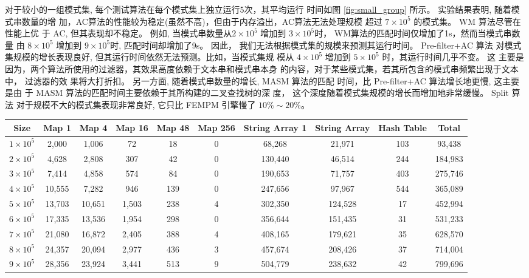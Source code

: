 对于较小的一组模式集, 每个测试算法在每个模式集上独立运行5次，其平均运行
时间如图 \ref{fig:small_group} 所示。 实验结果表明, 随着模式串数量的增
加，AC算法的性能较为稳定(虽然不高)，但由于内存溢出，AC算法无法处理规模
超过 $7 \times 10^5$ 的模式集。 \textsf{WM} 算法尽管在性能上优
于 \textsf{AC}, 但其表现却不稳定。 例如, 当模式串数量从$2 \times 10^5$
增加到 $3 \times 10^5$时， WM算法的匹配时间仅增加了1s，然而当模式串数量
由 $8 \times 10^5$ 增加到 $9 \times 10^5$时, 匹配时间却增加了9s。 因此，
我们无法根据模式集的规模来预测其运行时间。 \textsf{Pre-filter+AC} 算法
对模式集规模的增长表现良好, 但其运行时间依然无法预测。比如，当模式集规
模从 $4 \times 10^5$ 增加到 $5 \times 10^5$ 时，其运行时间几乎不变。 这
主要是因为，两个算法所使用的过滤器，其效果高度依赖于文本串和模式串本身
的内容，对于某些模式集，若其所包含的模式串频繁出现于文本中， 过滤器的效
果将大打折扣。 另一方面, 随着模式串数量的增长, \textsf{MASM} 算法的匹配
时间，比 \textsf{Pre-filter+AC} 算法增长地更慢, 这主要是由
于 \textsf{MASM} 算法的匹配时间主要依赖于其所构建的二叉查找树的深
度， 这个深度随着模式集规模的增长而增加地非常缓慢。 \textsf{Split} 算法
对于规模不大的模式集表现非常良好, 它只比 \textsf{FEMPM} 引擎慢了 $10\%
\sim 20\%$。


\begin{table}[!htp]
  \centering
  \footnotesize
  \label{tab:small}
  \begin{tabular}{cccccccccc}
 \hline
 Size &
 Map 1 &
 Map 4 &
 Map 16 &
 Map 48 &
 Map 256 &
 String Array 1&
 String Array   &
 Hash Table &
 Total\\
\hline
$1 \times 10^5$ &  2,000 &  1,006 &    72 &  18 & 0 &  68,268 &  21,971 & 103 &  93,438 \\
$2 \times 10^5$ &  4,628 &  2,808 &   307 &  42 & 0 & 130,440 &  46,514 & 244 & 184,983 \\
$3 \times 10^5$ &  7,414 &  4,858 &   574 &  84 & 0 & 190,653 &  71,757 & 403 & 275,746 \\
$4 \times 10^5$ & 10,555 &  7,282 &   946 & 139 & 0 & 247,656 &  97,967 & 544 & 365,089 \\
$5 \times 10^5$ & 13,703 & 10,651 & 1,503 & 238 & 4 & 302,350 & 124,528 &  17 & 452,994 \\
$6 \times 10^5$ & 17,335 & 13,536 & 1,954 & 298 & 0 & 356,644 & 151,435 &  31 & 531,233 \\
$7 \times 10^5$ & 21,080 & 16,872 & 2,405 & 388 & 4 & 408,165 & 179,621 &  35 & 628,570 \\
$8 \times 10^5$ & 24,357 & 20,094 & 2,977 & 436 & 3 & 457,674 & 208,426 &  37 & 714,004 \\
$9 \times 10^5$ & 28,356 & 23,924 & 3,441 & 513 & 9 & 504,779 & 238,632 &  42 & 799,696 \\
\hline
  \end{tabular}
\end{table}


